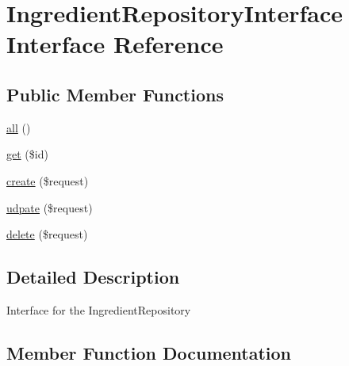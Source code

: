 \hypertarget{interface_app_1_1_repositories_1_1_product_1_1_ingredient_repository_interface}{}\section{Ingredient\+Repository\+Interface Interface Reference}
\label{interface_app_1_1_repositories_1_1_product_1_1_ingredient_repository_interface}
\subsection*{Public Member Functions}
\begin{DoxyCompactItemize}
\item 
\mbox{\hyperlink{interface_app_1_1_repositories_1_1_product_1_1_ingredient_repository_interface_af9d14e4ae6227970ad603987781573ca}{all}} ()
\item 
\mbox{\hyperlink{interface_app_1_1_repositories_1_1_product_1_1_ingredient_repository_interface_a50e3bfb586b2f42932a6a93f3fbb0828}{get}} (\$id)
\item 
\mbox{\hyperlink{interface_app_1_1_repositories_1_1_product_1_1_ingredient_repository_interface_a4fa811c83f27da01b0d92bdb2a711a13}{create}} (\$request)
\item 
\mbox{\hyperlink{interface_app_1_1_repositories_1_1_product_1_1_ingredient_repository_interface_a2aedea52c52e54ba3c4c9f60423e7ef1}{udpate}} (\$request)
\item 
\mbox{\hyperlink{interface_app_1_1_repositories_1_1_product_1_1_ingredient_repository_interface_a126a3799c44d72393ca4732081306dfd}{delete}} (\$request)
\end{DoxyCompactItemize}


\subsection{Detailed Description}
Interface for the Ingredient\+Repository 

\subsection{Member Function Documentation}
\mbox{\label{interface_app_1_1_repositories_1_1_product_1_1_ingredient_repository_interface_af9d14e4ae6227970ad603987781573ca}} 
